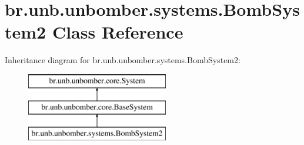 \hypertarget{classbr_1_1unb_1_1unbomber_1_1systems_1_1_bomb_system2}{\section{br.\+unb.\+unbomber.\+systems.\+Bomb\+System2 Class Reference}
\label{classbr_1_1unb_1_1unbomber_1_1systems_1_1_bomb_system2}
}
Inheritance diagram for br.\+unb.\+unbomber.\+systems.\+Bomb\+System2\+:\begin{figure}[H]
\begin{center}
\leavevmode
\includegraphics[height=3.000000cm]{classbr_1_1unb_1_1unbomber_1_1systems_1_1_bomb_system2}
\end{center}
\end{figure}
